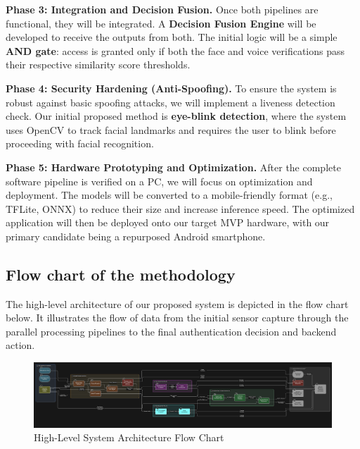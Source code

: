 \documentclass[12pt, a4paper]{article}
\begin{document}
\textbf{Phase 3: Integration and Decision Fusion.} Once both pipelines are functional, they will be integrated. A \textbf{Decision Fusion Engine} will be developed to receive the outputs from both. The initial logic will be a simple \textbf{AND gate}: access is granted only if both the face and voice verifications pass their respective similarity score thresholds.

\textbf{Phase 4: Security Hardening (Anti-Spoofing).} To ensure the system is robust against basic spoofing attacks, we will implement a liveness detection check. Our initial proposed method is \textbf{eye-blink detection}, where the system uses OpenCV to track facial landmarks and requires the user to blink before proceeding with facial recognition.

\textbf{Phase 5: Hardware Prototyping and Optimization.} After the complete software pipeline is verified on a PC, we will focus on optimization and deployment. The models will be converted to a mobile-friendly format (e.g., TFLite, ONNX) to reduce their size and increase inference speed. The optimized application will then be deployed onto our target MVP hardware, with our primary candidate being a repurposed Android smartphone.

\subsection{Flow chart of the methodology}
The high-level architecture of our proposed system is depicted in the flow chart below. It illustrates the flow of data from the initial sensor capture through the parallel processing pipelines to the final authentication decision and backend action.

\begin{figure}[h!]
    \centering
    \includegraphics[width=\textwidth]{block_diagram.png}
    \caption{High-Level System Architecture Flow Chart}
    \label{fig:flowchart}
\end{figure}

\end{document}
